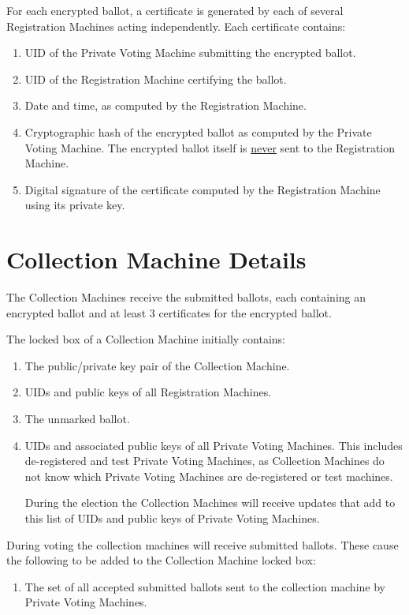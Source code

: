 \documentclass[12pt]{article}
\begin{document}
For each encrypted ballot, a certificate is generated
by each of several Registration Machines acting independently.  Each certificate
contains:
\begin{enumerate}
\item UID of the Private Voting Machine submitting the encrypted ballot.
\item UID of the Registration Machine certifying the ballot.
\item Date and time, as computed by the Registration Machine.
\item Cryptographic hash of the encrypted ballot as computed by the
      Private Voting Machine.  The encrypted ballot itself is
      \underline{never} sent to the Registration Machine.
\item Digital signature of the certificate computed
by the Registration Machine using its private key.
\end{enumerate}

\section{Collection Machine Details}

The Collection Machines receive the submitted ballots, each containing
an encrypted ballot and at least 3 certificates for the encrypted
ballot.

The locked box of a Collection Machine initially contains:
\begin{enumerate}
\item The public/private key pair of the Collection Machine.
\item UIDs and public keys of all Registration Machines.
\item The unmarked ballot.
\item UIDs and associated public keys of all Private Voting
Machines.  This includes de-registered and test Private Voting
Machines, as Collection Machines do not know which Private Voting
Machines are de-registered or test machines.

During the election the Collection Machines will receive updates
that add to this list of UIDs and public keys of Private Voting
Machines.
\setcounter{CML-COUNTER}{\value{enumi}}
\end{enumerate}

During voting the collection machines will
receive submitted ballots.  These cause the following to be
added to the Collection Machine locked box:

\begin{enumerate}
\setcounter{enumi}{\value{CML-COUNTER}}
\item The set of all accepted submitted ballots sent to the collection machine
by Private Voting Machines.
\setcounter{CML-COUNTER}{\value{enumi}}
\end{enumerate}
\end{document}

